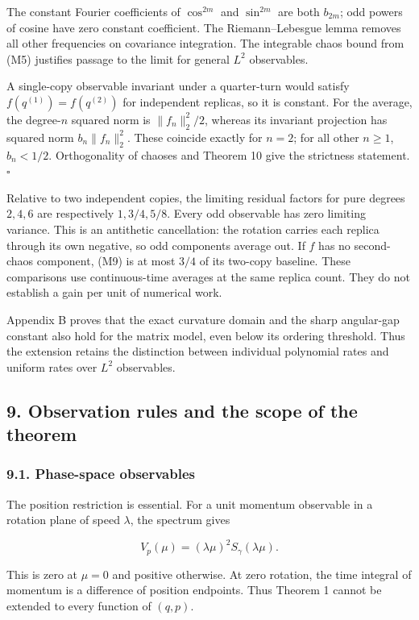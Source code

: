\documentclass[
  british,
  11pt,
  a4paper,
]{article}
\begin{document}
The constant Fourier coefficients of \(\cos^{2m}\) and \(\sin^{2m}\) are
both \(b_{2m}\); odd powers of cosine have zero constant coefficient.
The Riemann--Lebesgue lemma removes all other frequencies on covariance
integration. The integrable chaos bound from (M5) justifies passage to
the limit for general \(L^2\) observables.

A single-copy observable invariant under a quarter-turn would satisfy
\(f(q^{(1)})=f(q^{(2)})\) for independent replicas, so it is constant.
For the average, the degree-\(n\) squared norm is \(\|f_n\|_2^2/2\),
whereas its invariant projection has squared norm \(b_n\|f_n\|_2^2\).
These coincide exactly for \(n=2\); for all other \(n\ge1\),
\(b_n<1/2\). Orthogonality of chaoses and Theorem 10 give the strictness
statement. \(\square\)

Relative to two independent copies, the limiting residual factors for
pure degrees \(2,4,6\) are respectively \(1,3/4,5/8\). Every odd
observable has zero limiting variance. This is an antithetic
cancellation: the rotation carries each replica through its own
negative, so odd components average out. If \(f\) has no second-chaos
component, (M9) is at most \(3/4\) of its two-copy baseline. These
comparisons use continuous-time averages at the same replica count. They
do not establish a gain per unit of numerical work.

Appendix B proves that the exact curvature domain and the sharp
angular-gap constant also hold for the matrix model, even below its
ordering threshold. Thus the extension retains the distinction between
individual polynomial rates and uniform rates over \(L^2\) observables.

\subsection{9. Observation rules and the scope of the
theorem}\label{observation-rules-and-the-scope-of-the-theorem}

\subsubsection{9.1. Phase-space
observables}\label{phase-space-observables}

The position restriction is essential. For a unit momentum observable in
a rotation plane of speed \(\lambda\), the spectrum gives

\[
V_p(\mu)=(\lambda\mu)^2S_\gamma(\lambda\mu).
\]

This is zero at \(\mu=0\) and positive otherwise. At zero rotation, the
time integral of momentum is a difference of position endpoints. Thus
Theorem 1 cannot be extended to every function of \((q,p)\).
\end{document}

